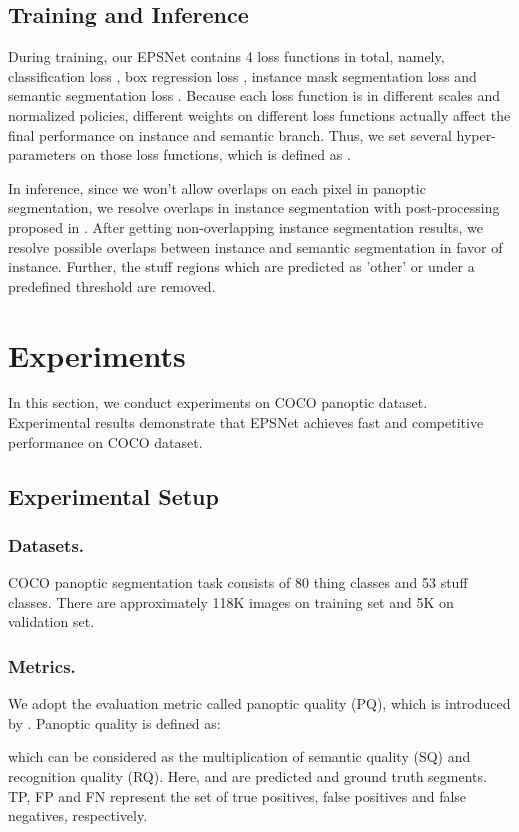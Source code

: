 \documentclass[runningheads]{llncs}
\begin{document}
\subsection{Training and Inference}
During training, our EPSNet contains 4 loss functions in total, namely,  classification loss , box regression loss , instance mask segmentation loss  and semantic segmentation loss .
Because each loss function is in different scales and normalized policies, different weights on different loss functions actually affect the final performance on instance and semantic branch. Thus, we set several hyper-parameters on those loss functions, which is defined as .

In inference, since we won’t allow overlaps on each pixel in panoptic segmentation, we resolve overlaps in instance segmentation with post-processing proposed in \cite{Li2018}. 
After getting non-overlapping instance segmentation results, we resolve possible overlaps between instance and semantic segmentation in favor of instance.
Further, the stuff regions which are predicted as 'other' or under a predefined threshold are removed.






\section{Experiments}
In this section, we conduct experiments on COCO \cite{Caesar2018} panoptic dataset. 
Experimental results demonstrate that EPSNet achieves fast and competitive performance on COCO dataset. 


\subsection{Experimental Setup}
\subsubsection{Datasets.}
COCO \cite{Caesar2018} panoptic segmentation task consists of 80 thing classes and 53 stuff classes. There are approximately 118K images on training set and 5K on validation set.
\subsubsection{Metrics.}
We adopt the evaluation metric called panoptic quality (PQ), which is introduced by \cite{Li2018}. Panoptic quality is defined as:

which can be considered as the multiplication of semantic quality (SQ) and recognition quality (RQ). Here,  and  are predicted and ground truth segments. TP, FP and FN represent the set of true positives, false positives and false negatives, respectively. 
\end{document}

